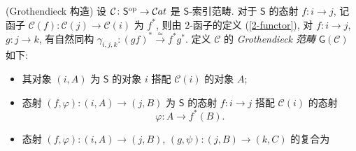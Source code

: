 \begin{definition}
	{(Grothendieck 构造)}
	设 $\mathcal C\colon \mathsf S^{\op}\to\mathcal Cat$ 是 $\mathsf S$-索引范畴. 对于 $\mathsf S$ 的态射 $f\colon i\to j$, 记函子 $\mathcal C(f)\colon \mathcal C(j)\to\mathcal C(i)$ 为 $f^*$, 则由 $2$-函子的定义 (\ref{2-functor}), 对 $f\colon i\to j$, $g\colon j\to k$, 有自然同构 $\gamma_{i,j,k}\colon (gf)^*\overset{\simeq}{\to} f^*g^*$. 定义 $\mathcal C$ 的 \emph{Grothendieck 范畴} $\mathsf G(\mathcal C)$ 如下:
	\vspace{1em}
	
	\begin{minipage}
		{0.5\textwidth}
		\begin{itemize}
			\item 其对象 $(i,A)$ 为 $\mathsf S$ 的对象 $i$ 搭配 $\mathcal C(i)$ 的对象 $A$;
			\item 态射 $(f,\varphi)\colon (i,A) \to (j,B)$ 为 $\mathsf S$ 的态射 $f\colon i\to j$ 搭配 $\mathcal C(i)$ 的态射 $$\varphi\colon A \to f^*(B).$$
			\item 态射 $(f,\varphi)\colon (i,A)\to (j,B)$, $(g,\psi)\colon (j,B)\to (k,C)$ 的复合为
		\end{itemize}
	\end{minipage}
	\quad
	\begin{minipage}
		{0.4\textwidth}
		\begin{center}
			
			\begin{tikzpicture}[x=0.6pt,y=0.6pt,yscale=-1,xscale=1]
				

\end{tikzpicture}
\end{center}
\end{minipage}
\end{definition}
